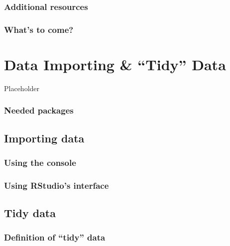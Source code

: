 \documentclass[12pt, krantz2,]{krantz}
\begin{document}
\hypertarget{additional-resources-2}{%
\subsection{Additional resources}\label{additional-resources-2}}

\hypertarget{whats-to-come-1}{%
\subsection{What's to come?}\label{whats-to-come-1}}

\hypertarget{tidy}{%
\chapter{Data Importing \& ``Tidy'' Data}\label{tidy}}

Placeholder

\hypertarget{needed-packages-2}{%
\subsection*{Needed packages}\label{needed-packages-2}}


\hypertarget{csv}{%
\section{Importing data}\label{csv}}

\hypertarget{using-the-console}{%
\subsection{Using the console}\label{using-the-console}}

\hypertarget{using-rstudios-interface}{%
\subsection{Using RStudio's interface}\label{using-rstudios-interface}}

\hypertarget{tidy-data-ex}{%
\section{Tidy data}\label{tidy-data-ex}}

\hypertarget{definition-of-tidy-data}{%
\subsection{Definition of ``tidy'' data}\label{definition-of-tidy-data}}
\end{document}
